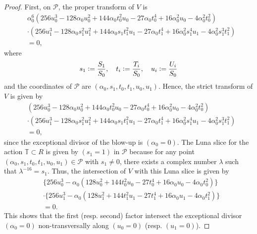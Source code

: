 \documentclass[12pt, pdftex]{amsart}
\theoremstyle{plain}
\theoremstyle{definition}
\numberwithin{equation}{section}
\def\PP{\mathcal{P}}
\def\a{\alpha}
\newcommand{\defeq}{\vcentcolon=}
\begin{document}
\begin{proof}
First, on $\PP$, the proper transform of $V$ is 
\begin{align*}
    &\a_0^6(256u_0^3-128\a_0u_0^2+144\a_0t_0^2u_0-27\a_0t_0^4+16\a_0^2u_0-4\a_0^2t_0^2)\\
    &\cdot(256u_1^3-128\a_0s_1^2u_1^2+144\a_0s_1t_1^2u_1-27\a_0t_1^4+16\a_0^2s_1^4u_1-4\a_0^2s_1^3t_1^2)\\
    &=0,
\end{align*}
where
\[s_1\defeq\frac{S_1}{S_0},\quad t_i\defeq\frac{T_i}{S_0},\quad u_i\defeq\frac{U_i}{S_0}\]
and the coordinates of $\PP$ are $(\a_0,s_1,t_0,t_1,u_0,u_1)$.
Hence, the strict transform of $V$ is given by 
\begin{align*}
    &(256u_0^3-128\a_0u_0^2+144\a_0t_0^2u_0-27\a_0t_0^4+16\a_0^2u_0-4\a_0^2t_0^2)\\
    &\cdot(256u_1^3-128\a_0s_1^2u_1^2+144\a_0s_1t_1^2u_1-27\a_0t_1^4+16\a_0^2s_1^4u_1-4\a_0^2s_1^3t_1^2)\\
    &=0,
\end{align*}
since the exceptional divisor of the blow-up is $(\a_0=0)$.
The Luna slice for the action $\mathbb{T}\subset R$ is given by $(s_1=1)$ in $\PP$ because for any point $(\a_0,s_1,t_0,t_1,u_0,u_1)\in\PP$ with $s_1\neq 0$, there exists a complex number $\lambda$ such that $\lambda^{-16}=s_1$.
Thus, the intersection of $V$ with this Luna slice is given by 
\begin{align*}
    &\{256u_0^3-\a_0(128u_0^2+144t_0^2u_0-27t_0^4+16\a_0u_0-4\a_0t_0^2)\}\\
    &\cdot\{256u_1^3-\a_0(128u_1^2+144t_1^2u_1-27t_1^4+16\a_0u_1-4\a_0t_1^2)\}\\
    &=0.
\end{align*}
This shows that the first (resp. second) factor intersect the exceptional divisor $(\a_0=0)$ non-transversally along $(u_0=0)$ (resp. $(u_1=0)$).


\end{proof}
\end{document}
